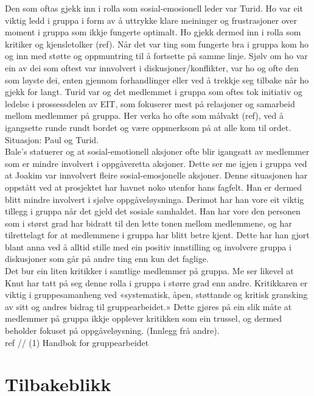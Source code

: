 Den som oftas gjekk inn i rolla som sosial-emosionell leder var Turid. Ho var eit viktig ledd i gruppa i form av å uttrykke klare meininger og frustrasjoner over moment i gruppa som ikkje fungerte optimalt. Ho gjekk dermed inn i rolla som kritiker og kjensletolker (ref). Når det var ting som fungerte bra i gruppa kom ho og inn med støtte og oppmuntring til å fortsette på samme linje. Sjølv om ho var ein av dei som oftest var innvolvert i diskusjoner/konflikter, var ho og ofte den som løyste dei, enten gjennom forhandlinger eller ved å trekkje seg tilbake når ho gjekk for langt. Turid var og det medlemmet i gruppa som oftes tok initiativ og ledelse i prossessdelen av EIT, som fokuserer mest på relasjoner og samarbeid mellom medlemmer på gruppa. Her verka ho ofte som målvakt (ref), ved å igangsette runde rundt bordet og være oppmerksom på at alle kom til ordet.
Situasjon: Paul og Turid.\\

Bale's statuerer og at sosial-emotionell aksjoner ofte blir igangsatt av medlemmer som er mindre involvert i oppgåveretta aksjoner. Dette ser me igjen i gruppa ved at Joakim var innvolvert fleire sosial-emosjonelle aksjoner. Denne situasjonen har oppstått ved at prosjektet har havnet noko utenfor hans fagfelt. Han er dermed blitt mindre involvert i sjølve oppgåveløysninga. Derimot har han vore eit viktig tillegg i gruppa når det gjeld det sosiale samhaldet. Han har vore den personen som i størst grad har bidratt til den lette tonen mellom medlemmene, og har tilrettelagt for at medlemmene i gruppa har blitt betre kjent. Dette har han gjort blant anna ved å alltid stille med ein positiv innstilling og involvere gruppa i diskusjoner som går på andre ting enn kun det faglige.\\

Det bur ein liten kritikker i samtlige medlemmer på gruppa. Me ser likevel at Knut har tatt på seg denne rolla i gruppa i større grad enn andre. Kritikkaren er viktig i gruppesamanheng ved «systematisk, åpen, støttande og kritisk gransking av sitt og andres bidrag til gruppearbeidet.»
Dette gjøres på ein slik måte at medlemmer på gruppa ikkje opplever kritikken som ein trussel, og dermed beholder fokuset på oppgåveløysning. (Innlegg frå andre).\\

ref // (1) Handbok for gruppearbeidet\\

\section{Tilbakeblikk}

